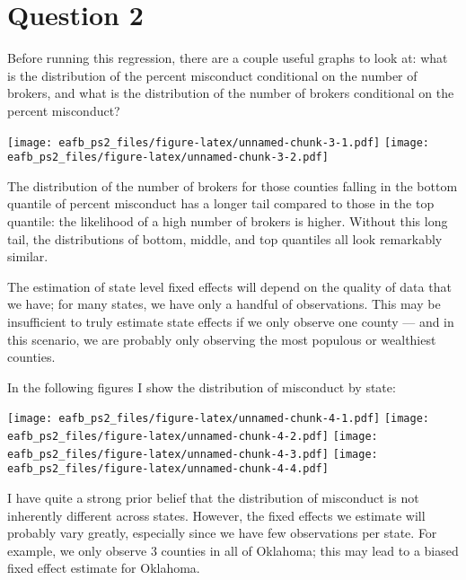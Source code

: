 \documentclass[
]{article}
\begin{document}
\hypertarget{question-2}{%
\section{Question 2}\label{question-2}}

Before running this regression, there are a couple useful graphs to look
at: what is the distribution of the percent misconduct conditional on
the number of brokers, and what is the distribution of the number of
brokers conditional on the percent misconduct?

\texttt{[image: eafb\_ps2\_files/figure-latex/unnamed-chunk-3-1.pdf]}
\texttt{[image: eafb\_ps2\_files/figure-latex/unnamed-chunk-3-2.pdf]}

The distribution of the number of brokers for those counties falling in
the bottom quantile of percent misconduct has a longer tail compared to
those in the top quantile: the likelihood of a high number of brokers is
higher. Without this long tail, the distributions of bottom, middle, and
top quantiles all look remarkably similar.

The estimation of state level fixed effects will depend on the quality
of data that we have; for many states, we have only a handful of
observations. This may be insufficient to truly estimate state effects
if we only observe one county --- and in this scenario, we are probably
only observing the most populous or wealthiest counties.

In the following figures I show the distribution of misconduct by state:

\texttt{[image: eafb\_ps2\_files/figure-latex/unnamed-chunk-4-1.pdf]}
\texttt{[image: eafb\_ps2\_files/figure-latex/unnamed-chunk-4-2.pdf]}
\texttt{[image: eafb\_ps2\_files/figure-latex/unnamed-chunk-4-3.pdf]}
\texttt{[image: eafb\_ps2\_files/figure-latex/unnamed-chunk-4-4.pdf]}

I have quite a strong prior belief that the distribution of misconduct
is not inherently different across states. However, the fixed effects we
estimate will probably vary greatly, especially since we have few
observations per state. For example, we only observe 3 counties in all
of Oklahoma; this may lead to a biased fixed effect estimate for
Oklahoma.
\end{document}
